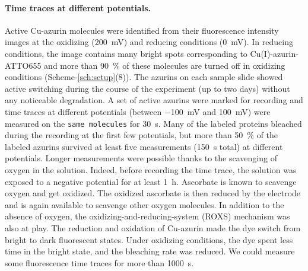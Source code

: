 \documentclass[journal=jacsat,manuscript=article]{achemso}
\begin{document}
\paragraph*{Time traces at different potentials.}
Active Cu-azurin molecules were identified from their fluorescence intensity images at the oxidizing (\SI{200}{\mV}) and reducing conditions (\SI{0}{\mV}).
In reducing conditions, the image contains many bright spots corresponding to Cu(I)-azurin-ATTO655 and more than \SI{90}{\percent} of these molecules are turned off in oxidizing conditions 
(Scheme-\ref{sch:setup}(8)).
The azurins on each sample slide showed active switching during the course of the experiment (up to two days) without any noticeable degradation.
A set of active azurins were marked for recording and time traces at different potentials (between \SI{-100}{\mV} and \SI{100}{\mV}) were measured on the \texttt{same molecules} 
for \SI{30}{\s}.
Many of the labeled proteins bleached during the recording at the first few potentials, but more than \SI{50}{\percent} of the labeled azurins survived at least five measurements (\SI{150}{\s}  total) at different potentials.
Longer measurements were possible thanks to the scavenging of oxygen in the solution.
Indeed, before recording the time trace, the solution was exposed to a negative potential for at least \SI{1}{\hour}.
Ascorbate is known to  scavenge oxygen\cite{dave1997effectiveness} and get oxidized.
The oxidized ascorbate is then reduced by the electrode and is again available to scavenge other oxygen molecules.
In addition to the absence of oxygen, the  oxidizing-and-reducing-system (ROXS) mechanism was also at play.\cite{cordes2009on}
The reduction and oxidation of Cu-azurin made the dye switch from bright to dark fluorescent states. Under oxidizing conditions, the dye spent less time in the bright state, and the bleaching rate was reduced.
We could measure some fluorescence time traces for more than \SI{1000}{\s}.\\
\end{document}
